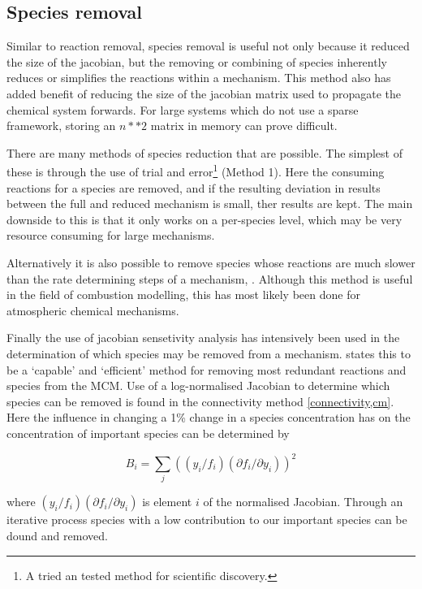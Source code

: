 \subsection{Species removal}
Similar to reaction removal, species removal is useful not only because it reduced the size of the jacobian, but the removing or combining of species inherently reduces or simplifies the reactions within a mechanism.  This method also has added benefit of reducing the size of the jacobian matrix used to propagate the chemical system forwards. For large systems which do not use a sparse framework, storing an $n**2$ matrix in memory can prove difficult.

There are many methods of species reduction that are possible. The simplest of these is through the use of trial and error\footnote{A tried an tested method for scientific discovery.} \citep{tur1990} (Method 1). Here the consuming reactions for a species are removed, and if the resulting deviation in results between the full and reduced mechanism is small, ther results are kept. The main downside to this is that it only works on a per-species level, which may be very resource consuming for large mechanisms.

Alternatively it is also possible to remove species whose reactions are much slower than the rate determining steps of a mechanism, \citep{frenk}. Although this method is useful in the field of combustion modelling, this has most likely been done for atmospheric chemical mechanisms. 

Finally the use of jacobian sensetivity analysis has intensively been used in the determination of which species may be removed from a mechanism.    
\cite{whitehouse1} states this to be a `capable' and `efficient' method for removing most redundant reactions and species from the MCM. Use of a log-normalised Jacobian to determine which species can be removed is found in the connectivity method \autoref{connectivity,cm}. 
Here the influence in changing a 1\%  change in a species concentration has on the concentration of important species can be determined by


\begin{equation}
B_i  = \sum_j(({y_i}/{f_i})({\partial f_i}/{\partial y_i}))^2 \label{connectivity}
\end{equation}

 where $({y_i}/{f_i})({\partial f_i}/{\partial y_i})$ is element $i$ of the normalised Jacobian. Through an iterative process species with a low contribution to our important species can be dound and removed.




